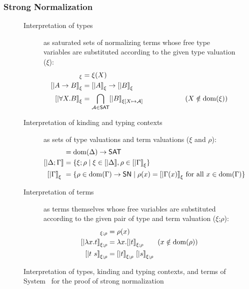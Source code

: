 \subsubsection*{Strong Normalization}
\begin{figure}
\begin{singlespace}
\begin{description}
\item[Interpretation of types] as saturated sets of normalizing terms
        whose free type variables are substituted according to
        the given type valuation ($\xi$):
\begin{align*}
[| X |]_\xi           &= \xi(X) \\ 
[| A -> B |]_\xi      &= [|A|]_\xi -> [|B|]_\xi \\
[| \forall X.B |]_\xi &= \bigcap_{\mathcal{A}\in\SAT} [|B|]_{\xi[X\mapsto\mathcal{A}]} \qquad\qquad\qquad (X\notin\dom(\xi))
\end{align*}
\item[Interpretation of kinding and typing contexts]
       as sets of type valuations and term valuations ($\xi$ and $\rho$):
\begin{align*}
[| \Delta        |] &= \dom(\Delta) -> \SAT \\
[| \Delta;\Gamma |] &= \{ \xi;\rho \mid \xi\in[|\Delta|], \rho\in[|\Gamma|]_\xi \} \\
[| \Gamma        |]_\xi\ &= \{ \rho \in \dom(\Gamma) -> \SN \mid \rho(x)=[|\Gamma(x)|]_\xi ~\text{for all}~x\in\dom(\Gamma) \}
\end{align*}
\item[Interpretation of terms]
        as terms themselves whose free variables are substituted according to
        the given pair of type and term valuation ($\xi$;$\rho$):
\begin{align*}
[| x      |]_{\xi;\rho} &= \rho(x) \\
[| \l x.t |]_{\xi;\rho} &= \l x . [|t|]_{\xi;\rho} \qquad (x\notin\dom(\rho)) \\
[| t ~ s  |]_{\xi;\rho} &= [| t |]_{\xi;\rho} ~ [| s |]_{\xi;\rho}
\end{align*}
\end{description}
\caption[Interpretation of System \F\ for proving strong normalization]
        {Interpretation of types, kinding and typing contexts, and terms
                of System \F\ for the proof of strong normalization}
\label{fig:interpF}
\end{singlespace}
\end{figure}

